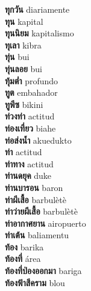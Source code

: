 \textbf{ ทุกวัน  } diariamente \\
\textbf{ ทุน  } kapital \\
\textbf{ ทุนนิยม  } kapitalismo \\
\textbf{ ทุเลา  } kibra \\
\textbf{ ทุ่น  } bui \\
\textbf{ ทุ่นลอย  } bui \\
\textbf{ ทุ้มต่ำ  } profundo \\
\textbf{ ทูต  } embahador \\
\textbf{ ทูพีซ  } bikini \\
\textbf{ ท่วงท่า  } actitud \\
\textbf{ ท่องเที่ยว  } biahe \\
\textbf{ ท่อส่งน้ำ  } akuedukto \\
\textbf{ ท่า  } actitud \\
\textbf{ ท่าทาง  } actitud \\
\textbf{ ท่านดยุค  } duke \\
\textbf{ ท่านบารอน  } baron \\
\textbf{ ท่าผีเสื้อ  } barbulètè \\
\textbf{ ท่าว่ายผีเสื้อ  } barbulètè \\
\textbf{ ท่าอากาศยาน  } airopuerto \\
\textbf{ ท่าเต้น  } baliamentu \\
\textbf{ ท้อง  } barika \\
\textbf{ ท้องที่  } área \\
\textbf{ ท้องที่ป่องออกมา  } bariga \\
\textbf{ ท้องฟ้าสีคราม  } blou \\

